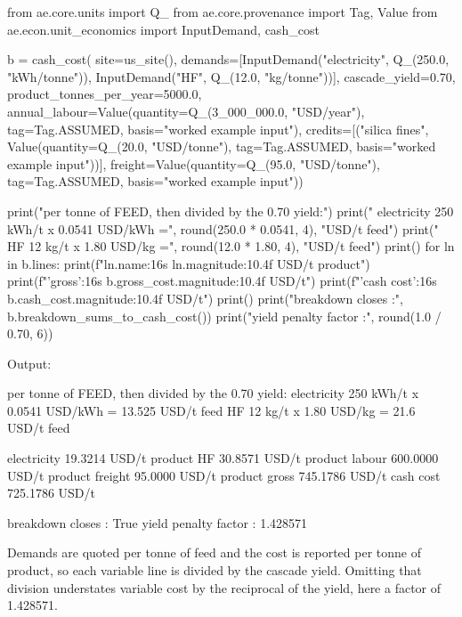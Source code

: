 \documentclass[10pt,a4paper,twoside]{report}
\begin{document}
\begin{doctestblock}
from ae.core.units import Q_
from ae.core.provenance import Tag, Value
from ae.econ.unit_economics import InputDemand, cash_cost

b = cash_cost(
    site=us_site(),
    demands=[InputDemand("electricity", Q_(250.0, "kWh/tonne")),
             InputDemand("HF", Q_(12.0, "kg/tonne"))],
    cascade_yield=0.70,
    product_tonnes_per_year=5000.0,
    annual_labour=Value(quantity=Q_(3_000_000.0, "USD/year"), tag=Tag.ASSUMED,
                        basis="worked example input"),
    credits=[("silica fines", Value(quantity=Q_(20.0, "USD/tonne"), tag=Tag.ASSUMED,
                                    basis="worked example input"))],
    freight=Value(quantity=Q_(95.0, "USD/tonne"), tag=Tag.ASSUMED,
                  basis="worked example input"))

print("per tonne of FEED, then divided by the 0.70 yield:")
print("  electricity 250 kWh/t x 0.0541 USD/kWh =", round(250.0 * 0.0541, 4), "USD/t feed")
print("  HF          12 kg/t   x 1.80   USD/kg  =", round(12.0 * 1.80, 4), "USD/t feed")
print()
for ln in b.lines:
    print(f"{ln.name:16s} {ln.magnitude:10.4f} USD/t product")
print(f"{'gross':16s} {b.gross_cost.magnitude:10.4f} USD/t")
print(f"{'cash cost':16s} {b.cash_cost.magnitude:10.4f} USD/t")
print()
print("breakdown closes        :", b.breakdown_sums_to_cash_cost())
print("yield penalty factor    :", round(1.0 / 0.70, 6))
\end{doctestblock}

{\footnotesize\color{slate}Output:\par}

\begin{outputblock}
per tonne of FEED, then divided by the 0.70 yield:
  electricity 250 kWh/t x 0.0541 USD/kWh = 13.525 USD/t feed
  HF          12 kg/t   x 1.80   USD/kg  = 21.6 USD/t feed

electricity         19.3214 USD/t product
HF                  30.8571 USD/t product
labour             600.0000 USD/t product
freight             95.0000 USD/t product
gross              745.1786 USD/t
cash cost          725.1786 USD/t

breakdown closes        : True
yield penalty factor    : 1.428571
\end{outputblock}

Demands are quoted per tonne of feed and the cost is reported per tonne of product, so each variable line is divided by the cascade yield. Omitting that division understates variable cost by the reciprocal of the yield, here a factor of 1.428571.
\end{document}
